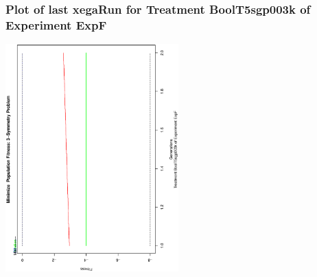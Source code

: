  \begin{frame}
 \frametitle{ Plot of last xegaRun for Treatment BoolT5sgp003k of Experiment ExpF }
 \begin{center}
\includegraphics[width=0.5\textwidth, angle=-90]
{ExpFPlotPopStatsFigure001.eps}
 \end{center}
 \label{templateReport/ExpFPlotPopStatsFigure001.eps}  
 \end{frame}

